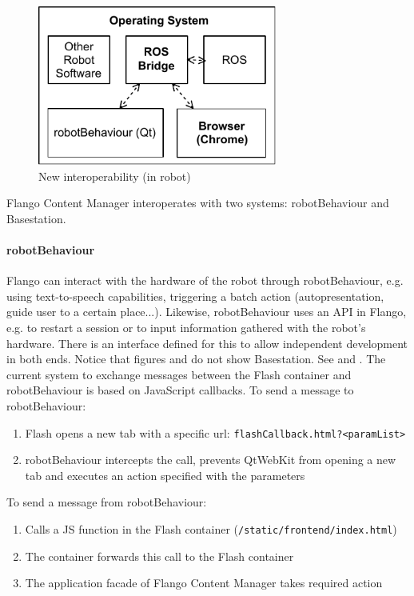 \begin{figure}[htb]
    \centering
    \includegraphics[width=0.7\textwidth]{figures/interoperability-new}
    \caption{New interoperability (in robot)}
    \label{fig:interoperability-new}
\end{figure}

Flango Content Manager interoperates with two systems: robotBehaviour and Basestation.

\paragraph{robotBehaviour} Flango can interact with the hardware of the robot through robotBehaviour, e.g. using text-to-speech capabilities, triggering a batch action (autopresentation, guide user to a certain place...).
Likewise, robotBehaviour uses an API in Flango, e.g. to restart a session or to input information gathered with the robot's hardware.
There is an interface defined for this to allow independent development in both ends.
Notice that figures  and  do not show Basestation. See  and .
The current system to exchange messages between the Flash container and robotBehaviour is based on JavaScript callbacks.
To send a message to robotBehaviour:
\begin{enumerate}
    \item Flash opens a new tab with a specific url: \texttt{flashCallback.html?\textless paramList\textgreater}
    \item robotBehaviour intercepts the call, prevents QtWebKit from opening a new tab and executes an action specified with the parameters
\end{enumerate}

To send a message from robotBehaviour:
\begin{enumerate}
    \item Calls a \ac{JS} function in the Flash container (\texttt{/static/frontend/index.html})
    \item The container forwards this call to the Flash container
    \item The application facade of Flango Content Manager takes required action
\end{enumerate}

